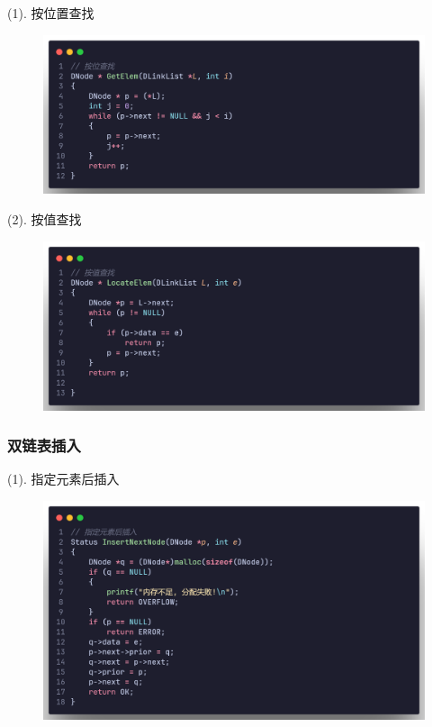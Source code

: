 (1). 按位置查找

\begin{figure}[H]
    \centering
    \includegraphics[scale=0.2]{"figure/Note/LinearList/DlNumSer.png"}
\end{figure}

(2). 按值查找

\begin{figure}[H]
    \centering
    \includegraphics[scale=0.2]{"figure/Note/LinearList/DlItemSer.png"}
\end{figure}

\subsubsection{双链表插入}

(1). 指定元素后插入

\begin{figure}[H]
    \centering
    \includegraphics[scale=0.2]{"figure/Note/LinearList/DlBInsert.png"}
\end{figure}

